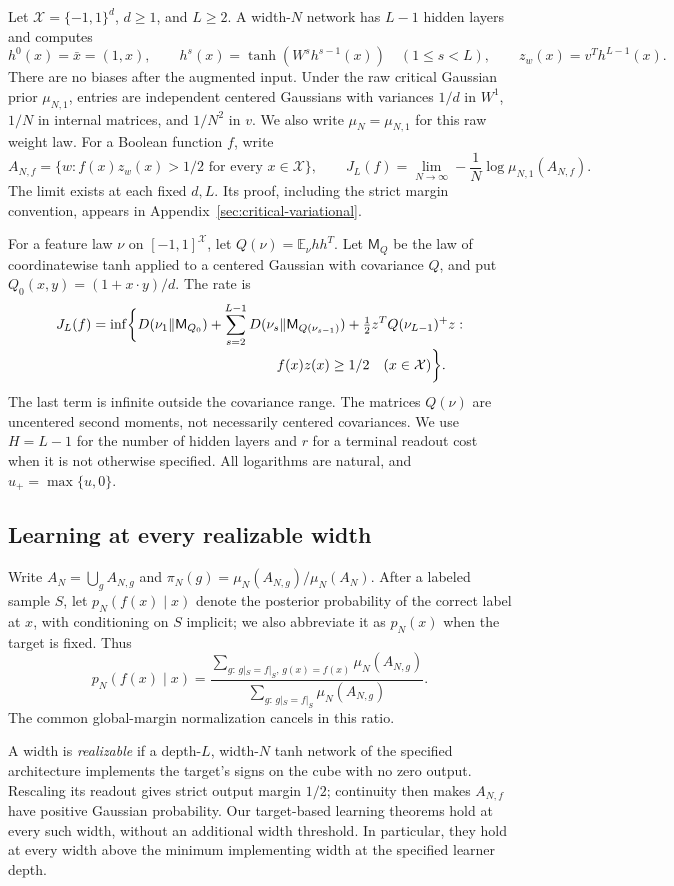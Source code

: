 \documentclass[11pt]{article}
\begin{document}
Let $\mathcal X=\{-1,1\}^d$, $d\ge1$, and $L\ge2$. A width-$N$
network has $L-1$ hidden layers and computes
\[
 h^0(x)=\bar x=(1,x),\qquad
 h^s(x)=\tanh(W^s h^{s-1}(x))\quad(1\le s<L),\qquad
 z_w(x)=v^T h^{L-1}(x).
\]
There are no biases after the augmented input. Under the raw critical
Gaussian prior $\mu_{N,1}$, entries are independent centered Gaussians
with variances $1/d$ in $W^1$, $1/N$ in internal matrices, and $1/N^2$
in $v$. We also write $\mu_N=\mu_{N,1}$ for this raw weight law.
For a Boolean function $f$, write
\[
 A_{N,f}=\{w:f(x)z_w(x)>1/2\text{ for every }x\in\mathcal X\},
 \qquad
 J_L(f)=\lim_{N\to\infty}-\frac1N\log\mu_{N,1}(A_{N,f}).
\]
The limit exists at each fixed $d,L$. Its proof, including the strict
margin convention, appears in Appendix~\ref{sec:critical-variational}.

For a feature law $\nu$ on $[-1,1]^{\mathcal X}$, let
$Q(\nu)=\mathbb E_\nu hh^T$. Let $\mathsf M_Q$ be the law of
coordinatewise tanh applied to a centered Gaussian with covariance $Q$,
and put $Q_0(x,y)=(1+x\cdot y)/d$. The rate is
\[
\begin{split}
 J_L(f)=\inf\biggl\{&D(\nu_1\Vert\mathsf M_{Q_0})+
  \sum_{s=2}^{L-1}D(\nu_s\Vert\mathsf M_{Q(\nu_{s-1})})
  +\tfrac12 z^TQ(\nu_{L-1})^+z:\\[-2pt]
 &\hspace{35mm}f(x)z(x)\ge1/2\quad(x\in\mathcal X)\biggr\}.
\end{split}
\]
The last term is infinite outside the covariance range. The matrices
$Q(\nu)$ are uncentered second moments, not necessarily centered
covariances. We use $H=L-1$ for the number of hidden layers and $r$
for a terminal readout cost when it is not otherwise specified. All
logarithms are natural, and $u_+=\max\{u,0\}$.

\subsection{Learning at every realizable width}

Write $A_N=\bigcup_g A_{N,g}$ and
$\pi_N(g)=\mu_N(A_{N,g})/\mu_N(A_N)$. After a labeled sample $S$,
let $p_N(f(x)\mid x)$ denote the posterior probability of the correct
label at $x$, with conditioning on $S$ implicit; we also abbreviate it
as $p_N(x)$ when the target is fixed. Thus
\[
 p_N(f(x)\mid x)=
 \frac{\sum_{g:\,g|_S=f|_S,\,g(x)=f(x)}\mu_N(A_{N,g})}
      {\sum_{g:\,g|_S=f|_S}\mu_N(A_{N,g})}.
\]
The common global-margin normalization cancels in this ratio.

A width is \emph{realizable} if a depth-$L$, width-$N$ tanh network
of the specified architecture implements the target's signs on the cube
with no zero output. Rescaling its readout gives strict output margin $1/2$; continuity then
makes $A_{N,f}$ have positive Gaussian probability. Our target-based
learning theorems hold at every such width, without an additional width
threshold. In particular, they hold at every width above the minimum
implementing width at the specified learner depth.
\end{document}
